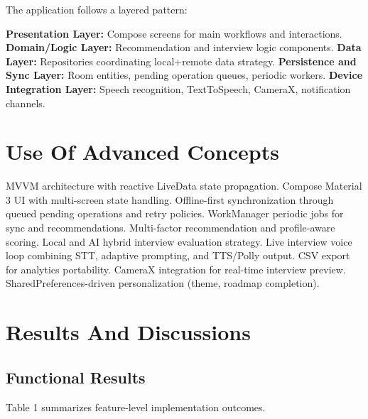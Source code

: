 \documentclass[conference]{IEEEtran}
\begin{document}
The application follows a layered pattern:

\textbf{Presentation Layer:} Compose screens for main workflows and interactions. \textbf{Domain/Logic Layer:} Recommendation and interview logic components. \textbf{Data Layer:} Repositories coordinating local+remote data strategy. \textbf{Persistence and Sync Layer:} Room entities, pending operation queues, periodic workers. \textbf{Device Integration Layer:} Speech recognition, TextToSpeech, CameraX, notification channels.

\section{Use Of Advanced Concepts}

MVVM architecture with reactive LiveData state propagation. Compose Material 3 UI with multi-screen state handling. Offline-first synchronization through queued pending operations and retry policies. WorkManager periodic jobs for sync and recommendations. Multi-factor recommendation and profile-aware scoring. Local and AI hybrid interview evaluation strategy. Live interview voice loop combining STT, adaptive prompting, and TTS/Polly output. CSV export for analytics portability. CameraX integration for real-time interview preview. SharedPreferences-driven personalization (theme, roadmap completion).

\section{Results And Discussions}

\subsection{Functional Results}

Table 1 summarizes feature-level implementation outcomes.
\end{document}
